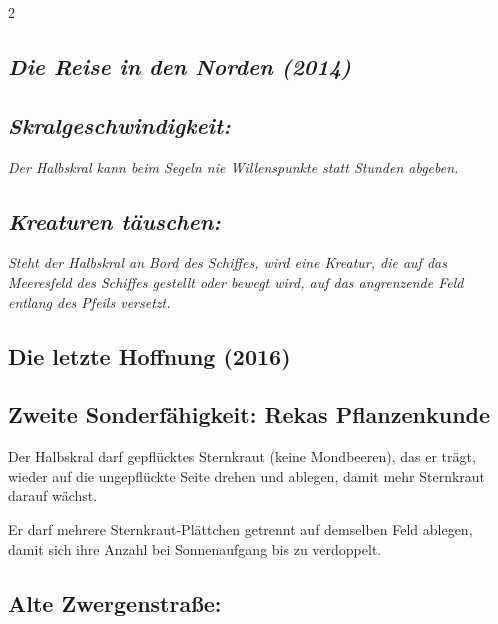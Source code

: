 \documentclass[10pt, a4paper, oneside]{book}
\newcommand{\fan}[1]{\textit{#1}}
\begin{document}
\begin{multicols*}{2}
\begin{nobgcolor}
\end{nobgcolor}



\columnbreak


\begin{bgcolor}
\section{\fan{Die Reise in den Norden (2014)}}


\subsection{\fan{Skralgeschwindigkeit:}}

\fan{Der Halbskral kann beim Segeln nie Willenspunkte statt Stunden abgeben.}


\subsection{\fan{Kreaturen täuschen:}}

\fan{Steht der Halbskral an Bord des Schiffes, wird eine Kreatur, die auf das Meeresfeld des Schiffes gestellt oder bewegt wird, auf das angrenzende Feld entlang des Pfeils versetzt.}


\end{bgcolor}




\begin{bgcolor}
\section{Die letzte Hoffnung (2016)}

\subsection{Zweite Sonderfähigkeit: Rekas Pflanzenkunde}

Der Halbskral darf gepflücktes Sternkraut (keine Mondbeeren\supercite{mh-mondbeeren,mh-begleitheft}), das er trägt, wieder auf die ungepflückte Seite drehen und ablegen, damit mehr Sternkraut darauf wächst.
\supercite{dh11-heldenkarte-halbskral}

Er darf mehrere Sternkraut-Plättchen getrennt auf demselben Feld ablegen, damit sich ihre Anzahl bei Sonnenaufgang bis zu verdoppelt.
\supercite{dh-faq,dh-begleitheft}

 


\subsection{Alte Zwergenstraße:}


\end{bgcolor}
\end{multicols*}
\end{document}
